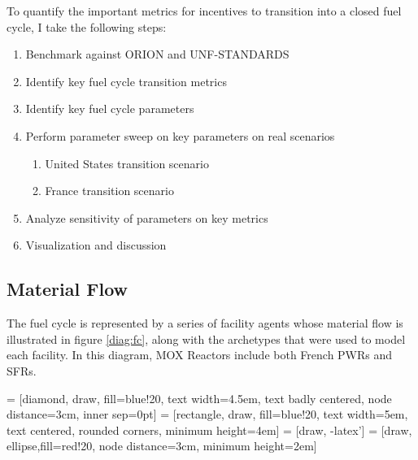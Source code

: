 
To quantify the important metrics for incentives to transition
into a closed fuel cycle, I take the following steps:

\begin{enumerate}
    \item Benchmark \Cyclus against ORION and \gls{UNF-STANDARDS}
    \item Identify key fuel cycle transition metrics
    \item Identify key fuel cycle parameters
    \item Perform parameter sweep on key parameters on real scenarios
    \begin{enumerate}
        \item United States transition scenario
        \item France transition scenario
    \end{enumerate}
    \item Analyze sensitivity of parameters on key metrics
    \item Visualization and discussion
\end{enumerate}

\subsection{Material Flow}

The fuel cycle is represented by a series of facility agents whose material 
flow is illustrated in figure \ref{diag:fc}, along with
the \Cyclus archetypes that were used to model each facility.
In this diagram, \gls{MOX} Reactors include both French \glspl{PWR} and 
\glspl{SFR}.

 = [diamond, draw, fill=blue!20, 
text width=4.5em, text badly centered, node distance=3cm, inner sep=0pt]
 = [rectangle, draw, fill=blue!20, 
text width=5em, text centered, rounded corners, minimum height=4em]
 = [draw, -latex']
 = [draw, ellipse,fill=red!20, node distance=3cm,
minimum height=2em]


